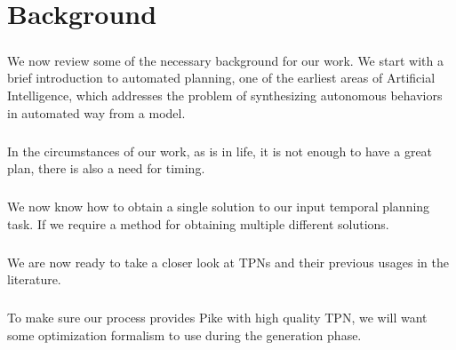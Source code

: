 \chapter{Background}
\label{chap:background}

\paragraph{} We now review some of the necessary background for our work.
We start with a brief introduction to automated planning, one of the earliest areas of Artificial Intelligence, which addresses the problem of synthesizing autonomous behaviors in automated way from a model.

% 

\paragraph{} In the circumstances of our work, as is in life, it is not enough to have a great plan, there is also a need for timing.  


\paragraph{} We now know how to obtain a single solution to our input temporal planning task. If we require a method for obtaining multiple different solutions. 


\paragraph{} We are now ready to take a closer look at TPNs and their previous usages in the literature.


\paragraph{} To make sure our process provides Pike with high quality TPN, we will want some optimization formalism to use during the generation phase. 
